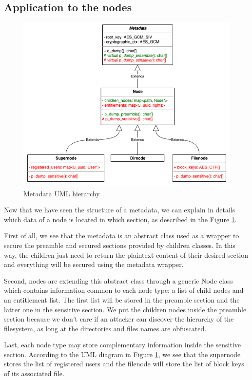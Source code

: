 \documentclass[../main.tex]{subfiles}
\begin{document}
\subsection{Application to the nodes}
\label{section:lauxus:nodes_hierarchy}

\begin{figure}[h]
    \centering
    \includegraphics[width=.75\textwidth]{images/lauxus/metadata_hierarchy}
    
    \caption{Metadata UML hierarchy}
    \label{figure:lauxus:metadata_hierarchy}
\end{figure}
\par Now that we have seen the structure of a metadata, we can explain in details which data of a node is located in which section, as described in the Figure \ref{figure:lauxus:metadata_hierarchy}.
\par First of all, we see that the metadata is an abstract class used as a wrapper to secure the preamble and secured sections provided by children classes. In this way, the children just need to return the plaintext content of their desired section and everything will be secured using the metadata wrapper.
\par Second, nodes are extending this abstract class through a generic Node class which contains information common to each node type: a list of child nodes and an entitlement list. The first list will be stored in the preamble section and the latter one in the sensitive section. We put the children nodes inside the preamble section because we don't care if an attacker can discover the hierarchy of the filesystem, as long at the directories and files names are obfuscated.
\par Last, each node type may store complementary information inside the sensitive section. According to the UML diagram in Figure \ref{figure:lauxus:metadata_hierarchy}, we see that the supernode stores the list of registered users and the filenode will store the list of block keys of its associated file.
\end{document}
